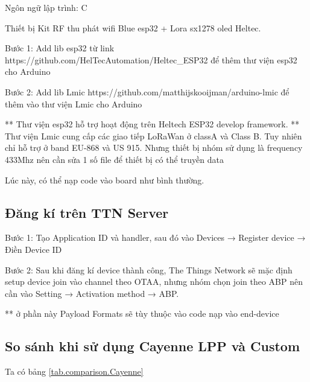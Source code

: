 Ngôn ngữ lập trình: C

Thiết bị Kit RF thu phát wifi Blue esp32 + Lora sx1278 oled Heltec.

\begin{description}
    \item Bước 1: Add lib esp32 từ link https://github.com/HelTecAutomation/Heltec\_ESP32 để thêm thư viện esp32 cho Arduino
    \item Bước 2: Add lib Lmic https://github.com/matthijskooijman/arduino-lmic để thêm vào thư viện Lmic cho Arduino
\end{description}

** Thư viện esp32 hỗ trợ hoạt động trên Heltech ESP32 develop framework.
** Thư viện Lmic cung cấp các giao tiếp LoRaWan ở classA và Class B. Tuy nhiên chỉ hỗ trợ ở band EU-868 và US 915. Nhưng thiết bị nhóm sử dụng là frequency 433Mhz nên cần sửa 1 số file để thiết bị có thể truyền data

Lúc này, có thể nạp code vào board như bình thường.

\subsection{Đăng kí trên TTN Server}
\begin{description}
    \item Bước 1: Tạo Application ID và handler, sau đó vào Devices → Register device → Điền Device ID  
    \item Bước 2: Sau khi đăng kí device thành công, The Things Network sẽ mặc định setup device join vào channel theo OTAA, nhưng nhóm chọn join theo ABP nên cần vào Setting → Activation method → ABP.
    
\end{description}



** ở phần này Payload Formats sẽ tùy thuộc vào code nạp vào end-device



\subsection{So sánh khi sử dụng Cayenne LPP và Custom}

Ta có bảng \ref{tab.comparison.Cayenne}


